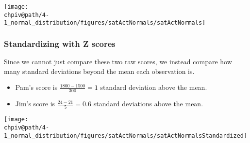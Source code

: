 \documentclass[slidestop,compress,mathserif]{beamer}
\makeatletter
\def\chpiv@path{../../Chp 4}
\makeatother
\begin{document}

\begin{frame}
\frametitle{}


\begin{center}
\texttt{[image: \\chpiv@path/4-1\_normal\_distribution/figures/satActNormals/satActNormals]}
\end{center}

\end{frame}


\begin{frame}
\frametitle{Standardizing with Z scores}

Since we cannot just compare these two raw scores, we instead compare how many standard deviations beyond the mean each observation is.

\begin{itemize}

\item Pam's score is $\frac{1800 - 1500}{300} = 1$ standard deviation above the mean.

\item Jim's score is $\frac{24 - 21}{5} = 0.6$ standard deviations above the mean.

\end{itemize}

\begin{center}
\texttt{[image: \\chpiv@path/4-1\_normal\_distribution/figures/satActNormals/satActNormalsStandardized]}
\end{center}

\end{frame}

\end{document}
